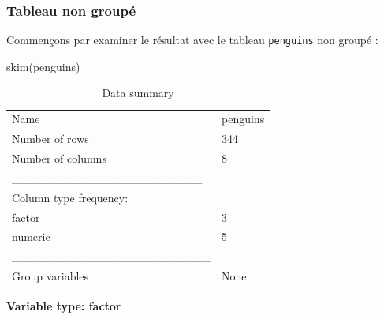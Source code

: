 \documentclass[
  a4paper,
  DIV=11,
  numbers=noendperiod,
  oneside]{scrreprt}
\newenvironment{Shaded}{}{}
\newcommand{\FunctionTok}[1]{\textcolor[rgb]{0.44,0.26,0.76}{#1}}
\newcommand{\NormalTok}[1]{\textcolor[rgb]{0.14,0.16,0.18}{#1}}
\begin{document}
\hypertarget{tableau-non-groupuxe9}{%
\subsubsection{Tableau non groupé}\label{tableau-non-groupuxe9}}

Commençons par examiner le résultat avec le tableau \texttt{penguins}
non groupé :

\begin{Shaded}
\begin{Highlighting}[]
\FunctionTok{skim}\NormalTok{(penguins)}
\end{Highlighting}
\end{Shaded}

\begin{longtable}[]{@{}ll@{}}
\caption{Data summary}\tabularnewline
\toprule()
\endhead
Name & penguins \\
Number of rows & 344 \\
Number of columns & 8 \\
\_\_\_\_\_\_\_\_\_\_\_\_\_\_\_\_\_\_\_\_\_\_\_ & \\
Column type frequency: & \\
factor & 3 \\
numeric & 5 \\
\_\_\_\_\_\_\_\_\_\_\_\_\_\_\_\_\_\_\_\_\_\_\_\_ & \\
Group variables & None \\
\bottomrule()
\end{longtable}

\textbf{Variable type: factor}
\end{document}
